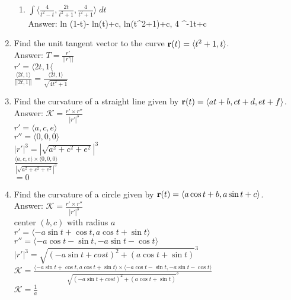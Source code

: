 \documentclass[11pt]{article}
\begin{document}
\begin{enumerate}
\begin{enumerate}
        \item $\int \langle \frac{4}{t^2-t}, \frac{2t}{t^2+1}, \frac{4}{t^2+1} \rangle \; dt$
        \\
        Answer:  ln (1-t)- ln(t)+c, ln(t^2+1)+c, 4 \tan^{-1}t+c \rangle



    \end{enumerate}
    
    
    
    
    \item Find the unit tangent vector to the curve ${\bf r}(t) = \langle t^2+1, t \rangle$.
    \\
    Answer:
    $T= \frac{r'}{||r'||} $
    \\
    $r'= \langle 2t, 1 \langle $
    \\
    $\frac{\langle 2t, 1 \rangle}{||2t,1||}=\frac{\langle 2t, 1 \rangle}{\sqrt{4t^2+1}} $
    
    \item Find the curvature of a straight line given by ${\bf r}(t) = \langle at+b, ct+d, e t+f \rangle$.
    \\
    Answer: $\mathcal{K}= \frac{r' \times r''}{|r'|^3} $
    \\
    $r'=\langle a,c,e \rangle $
    \\
    $r''=\langle 0,0,0 \rangle $
    \\
    $|r'|^3=|\sqrt{a^2+c^2+e^2}|^3 $
    \\
    $\frac{\langle a,c,e \rangle \times \langle 0,0,0 \rangle}{|\sqrt{a^2+c^2+e^2}|^3} $
    \\
    $=0$
    
 
 \item Find the curvature of a circle given by ${\bf r}(t) = \langle a \cos t + b, a \sin t +c \rangle$.
 \\
 Answer:  $\mathcal{K}= \frac{r' \times r''}{|r'|^3} $
 \\
 center $(b,c)$ with radius $a$
 \\
 $r'=\langle -a\sin t+ \cos t, a\cos t + \sin t \rangle  $
 \\
 $r''=\langle -a\cos t- \sin t, -a\sin t - \cos t \rangle $
 \\
 $|r'|^3= \sqrt{(-a\sin t + cos t)^2+(a \cos t + \sin t)}^3 $
 \\
 $\mathcal{K}= \frac{\langle -a\sin t+ \cos t, a\cos t + \sin t \rangle \times \langle -a\cos t- \sin t, -a\sin t - \cos t \rangle}{ \sqrt{(-a\sin t + cos t)^2+(a \cos t + \sin t)}^3} $
 \\
  $\mathcal{K}= \frac{1}{a}$
    
    
    

\end{enumerate}
\end{document}
